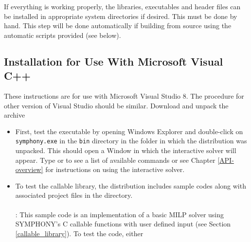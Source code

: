 If everything is working properly, the libraries, executables and header files
can be installed in appropriate system directories if desired. This must be
done by hand. This step will be done automatically if building from source
using the automatic scripts provided (see below).

\subsection{Installation for Use With Microsoft Visual C++}

These instructions are for use with Microsoft Visual Studio 8. The procedure
for other version of Visual Studio should be similar. Download and unpack the
archive 
\begin{itemize}
\item First, test the executable by opening Windows Explorer and double-click
on {\color{Brown}\texttt{symphony.exe}} in the {\color{Brown}\texttt{bin}}
directory in the folder in which the distribution was unpacked. This should
open a Window in which the interactive solver will appear. Type 
or  to see a list of available commands or see Chapter
\ref{API-overview} for instructions on using the interactive solver.

\item To test the callable library, the distribution includes sample codes
along with associated project files in the  directory. \\ \\
: This sample code is an implementation of a basic MILP
solver using SYMPHONY's C callable functions with user defined input (see
Section \ref{callable_library}). To test the code, either


\end{itemize}
